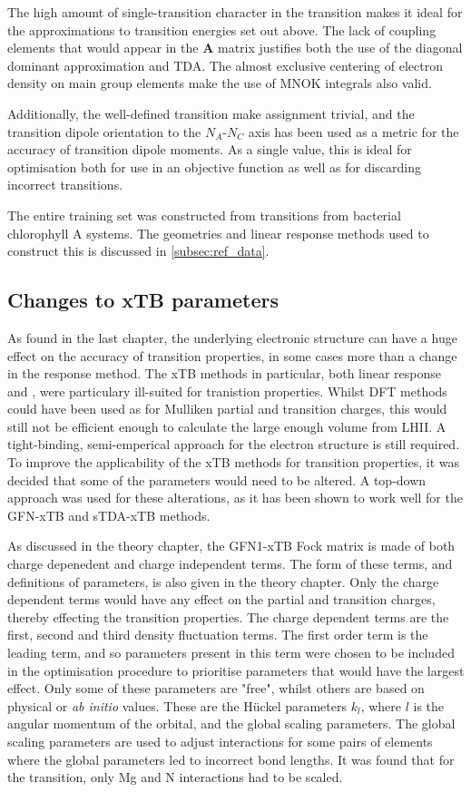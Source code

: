 The high amount of single-transition character in the \Qy transition makes it ideal
for the approximations to transition energies set out above. The lack of coupling
elements that would appear in the $\mathbf{A}$ matrix justifies both the use of
the diagonal dominant approximation and TDA. The almost exclusive centering of
electron density on main group elements make the use of MNOK integrals also valid.

Additionally, the well-defined transition make assignment trivial, and the transition
dipole orientation to the $N_A$-$N_C$ axis has been used as a metric for the accuracy
of transition dipole moments. As a single value, this is ideal for optimisation 
both for use in an objective function as well as for discarding incorrect transitions.

The entire training set was constructed from \Qy transitions from bacterial chlorophyll 
A systems. The geometries and linear response methods used to construct this is
discussed in \ref{subsec:ref_data}.

\subsection{Changes to xTB parameters}
\label{subsec:chl_method}

As found in the last chapter, the underlying electronic structure can have a huge
effect on the accuracy of transition properties, in some cases more than a change
in the response method. The xTB methods in particular, both linear response and
\dxtb, were particulary ill-suited for tranistion properties. Whilst DFT methods
could have been used as for Mulliken partial and transition charges, this would
still not be efficient enough to calculate the large enough volume from LHII. A 
tight-binding, semi-emperical approach for the electron structure is still required.
To improve the applicability of the xTB methods for transition properties, it was
decided that some of the parameters would need to be altered. A top-down approach
was used for these alterations, as it has been shown to work well for the GFN-xTB
and sTDA-xTB methods. 

As discussed in the theory chapter, the GFN1-xTB Fock matrix is made of both charge
depenedent and charge independent terms. The form of these terms, and definitions
of parameters, is also given in the theory chapter. Only the charge dependent terms would
have any effect on the partial and transition charges, thereby effecting the transition
properties. The charge dependent terms are the first, second and third density fluctuation
terms. The first order term is the leading term, and so parameters present in this
term were chosen to be included in the optimisation procedure to prioritise parameters
that would have the largest effect. Only some of these parameters are "free", 
whilst others are based on physical or \emph{ab initio} values. These are the H{\"u}ckel
parameters $k_l$, where $l$ is the angular momentum of the orbital, and the global
scaling parameters. The global scaling parameters are used to adjust interactions
for some pairs of elements where the global parameters led to incorrect bond lengths.
It was found that for the \Qy transition, only Mg and N interactions had to be scaled.

